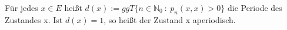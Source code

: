 Für jedes $x \in E$ heißt $d(x):=ggT \lbrace n \in \mathbb{N}_{0} \: : \: p_{n}(x,x) > 0  \rbrace$ die Periode des Zustandes x.
Ist $d(x)=1$, so heißt der Zustand x aperiodisch.